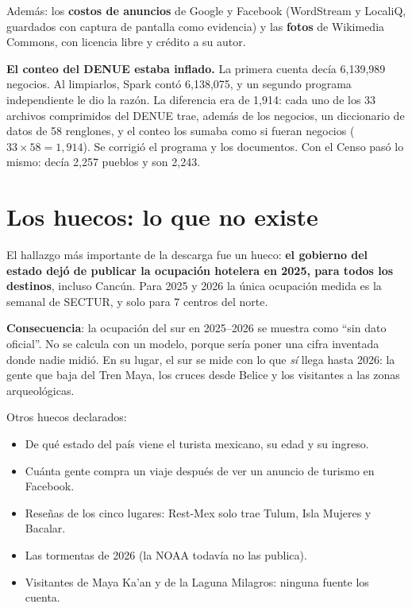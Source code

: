 Además: los \textbf{costos de anuncios} de Google y Facebook (WordStream y LocaliQ, guardados con captura de pantalla
como evidencia) y las \textbf{fotos} de Wikimedia Commons, con licencia libre y crédito a su autor.

\begin{error}
\textbf{El conteo del DENUE estaba inflado.} La primera cuenta decía 6,139,989 negocios. Al limpiarlos, Spark contó
6,138,075, y un segundo programa independiente le dio la razón. La diferencia era de 1,914: cada uno de los 33 archivos
comprimidos del DENUE trae, además de los negocios, un diccionario de datos de 58 renglones, y el conteo los sumaba como
si fueran negocios ($33\times58=1{,}914$). Se corrigió el programa y los documentos. Con el Censo pasó lo mismo: decía
2,257 pueblos y son 2,243.
\end{error}

\section{Los huecos: lo que no existe}
El hallazgo más importante de la descarga fue un hueco: \textbf{el gobierno del estado dejó de publicar la ocupación
hotelera en 2025, para todos los destinos}, incluso Cancún. Para 2025 y 2026 la única ocupación medida es la semanal de
SECTUR, y solo para 7 centros del norte.

\textbf{Consecuencia}: la ocupación del sur en 2025–2026 se muestra como ``sin dato oficial''. No se calcula con un
modelo, porque sería poner una cifra inventada donde nadie midió. En su lugar, el sur se mide con lo que \emph{sí} llega
hasta 2026: la gente que baja del Tren Maya, los cruces desde Belice y los visitantes a las zonas arqueológicas.

Otros huecos declarados:
\begin{itemize}
\item De qué estado del país viene el turista mexicano, su edad y su ingreso.
\item Cuánta gente compra un viaje después de ver un anuncio de turismo en Facebook.
\item Reseñas de los cinco lugares: Rest-Mex solo trae Tulum, Isla Mujeres y Bacalar.
\item Las tormentas de 2026 (la NOAA todavía no las publica).
\item Visitantes de Maya Ka'an y de la Laguna Milagros: ninguna fuente los cuenta.
\end{itemize}

